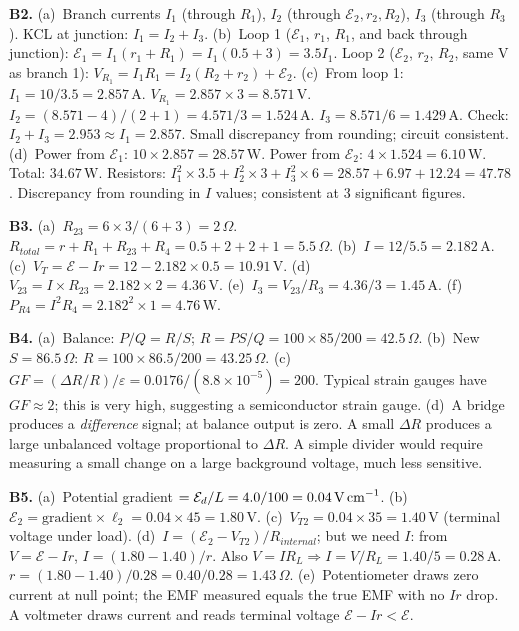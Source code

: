 \textbf{B2.}
(a)~Branch currents $I_1$ (through $R_1$), $I_2$
(through $\mathcal{E}_2,r_2,R_2$), $I_3$ (through
$R_3$). KCL at junction: $I_1=I_2+I_3$. \quad
(b)~Loop 1 ($\mathcal{E}_1$, $r_1$, $R_1$, and
back through junction):
$\mathcal{E}_1=I_1(r_1+R_1)=I_1(0.5+3)=3.5I_1$.
Loop 2 ($\mathcal{E}_2$, $r_2$, $R_2$, same V as
branch 1):
$V_{R_1}=I_1R_1=I_2(R_2+r_2)+\mathcal{E}_2$. \quad
(c)~From loop 1: $I_1=10/3.5=2.857\,\text{A}$.
$V_{R_1}=2.857\times3=8.571\,\text{V}$.
$I_2=(8.571-4)/(2+1)=4.571/3=1.524\,\text{A}$.
$I_3=8.571/6=1.429\,\text{A}$.
Check: $I_2+I_3=2.953\approx I_1=2.857$. Small
discrepancy from rounding; circuit consistent. \quad
(d)~Power from $\mathcal{E}_1$: $10\times2.857
=28.57\,\text{W}$.
Power from $\mathcal{E}_2$: $4\times1.524
=6.10\,\text{W}$.
Total: $34.67\,\text{W}$.
Resistors: $I_1^2\times3.5+I_2^2\times3+I_3^2\times6
=28.57+6.97+12.24=47.78$. Discrepancy from rounding
in $I$ values; consistent at 3 significant figures.

\textbf{B3.}
(a)~$R_{23}=6\times3/(6+3)=2\,\Omega$.
$R_{total}=r+R_1+R_{23}+R_4=0.5+2+2+1=5.5\,\Omega$.
\quad
(b)~$I=12/5.5=2.182\,\text{A}$. \quad
(c)~$V_T=\mathcal{E}-Ir=12-2.182\times0.5
=10.91\,\text{V}$. \quad
(d)~$V_{23}=I\times R_{23}=2.182\times2
=4.36\,\text{V}$. \quad
(e)~$I_3=V_{23}/R_3=4.36/3=1.45\,\text{A}$. \quad
(f)~$P_{R4}=I^2R_4=2.182^2\times1=4.76\,\text{W}$.

\textbf{B4.}
(a)~Balance: $P/Q=R/S$; $R=PS/Q=100\times85/200
=42.5\,\Omega$. \quad
(b)~New $S=86.5\,\Omega$:
$R=100\times86.5/200=43.25\,\Omega$. \quad
(c)~$GF=(\Delta R/R)/\varepsilon
=0.0176/(8.8\times10^{-5})=200$.
Typical strain gauges have $GF\approx2$; this
is very high, suggesting a semiconductor strain
gauge. \quad
(d)~A bridge produces a \textit{difference} signal;
at balance output is zero. A small $\Delta R$ produces
a large unbalanced voltage proportional to $\Delta R$.
A simple divider would require measuring a small
change on a large background voltage, much less
sensitive.

\textbf{B5.}
(a)~Potential gradient $=\mathcal{E}_d/L
=4.0/100=0.04\,\text{V\,cm}^{-1}$. \quad
(b)~$\mathcal{E}_2=\text{gradient}\times\ell_2
=0.04\times45=1.80\,\text{V}$. \quad
(c)~$V_{T2}=0.04\times35=1.40\,\text{V}$ (terminal
voltage under load). \quad
(d)~$I=(\mathcal{E}_2-V_{T2})/R_{internal}$;
but we need $I$: from $V=\mathcal{E}-Ir$,
$I=(1.80-1.40)/r$. Also $V=IR_L\Rightarrow
I=V/R_L=1.40/5=0.28\,\text{A}$.
$r=(1.80-1.40)/0.28=0.40/0.28=1.43\,\Omega$. \quad
(e)~Potentiometer draws zero current at null point;
the EMF measured equals the true EMF with no $Ir$
drop. A voltmeter draws current and reads terminal
voltage $\mathcal{E}-Ir<\mathcal{E}$.


